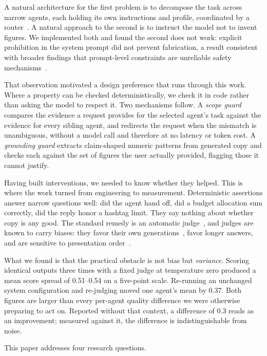 \documentclass[9pt,twocolumn]{extarticle}
\begin{document}
A natural architecture for the first problem is to decompose the task across
narrow agents, each holding its own instructions and profile, coordinated by a
router~\cite{wu2023autogen, langgraph2024}. A natural approach to the second is
to instruct the model not to invent figures. We implemented both and found the
second does not work: explicit prohibition in the system prompt did not prevent
fabrication, a result consistent with broader findings that prompt-level
constraints are unreliable safety mechanisms~\cite{rebedea2023nemo}.

That observation motivated a design preference that runs through this work.
Where a property can be checked deterministically, we check it in code rather
than asking the model to respect it. Two mechanisms follow. A \textit{scope
guard} compares the evidence a request provides for the selected agent's task
against the evidence for every sibling agent, and redirects the request when
the mismatch is unambiguous, without a model call and therefore at no latency
or token cost. A \textit{grounding guard} extracts claim-shaped numeric
patterns from generated copy and checks each against the set of figures the
user actually provided, flagging those it cannot justify.

Having built interventions, we needed to know whether they helped. This is
where the work turned from engineering to measurement. Deterministic assertions
answer narrow questions well: did the agent hand off, did a budget allocation
sum correctly, did the reply honor a hashtag limit. They say nothing about
whether copy is any good. The standard remedy is an automatic
judge~\cite{zheng2023judging, liu2023geval}, and judges are known to carry
biases: they favor their own generations~\cite{panickssery2024selfpref},
favor longer answers, and are sensitive to presentation
order~\cite{wang2023fair, koo2023benchmarking}.

What we found is that the practical obstacle is not bias but \textit{variance}.
Scoring identical outputs three times with a fixed judge at temperature zero
produced a mean score spread of 0.51--0.54 on a five-point scale. Re-running an
unchanged system configuration and re-judging moved one agent's mean by 0.37.
Both figures are larger than every per-agent quality difference we were
otherwise preparing to act on. Reported without that context, a difference of
0.3 reads as an improvement; measured against it, the difference is
indistinguishable from noise.

This paper addresses four research questions.
\end{document}

